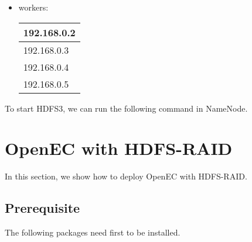 \documentclass[letterpaper,12pt]{article}
\newcommand{\openec}{{\sf\small OpenEC}\xspace}
\begin{document}
\begin{itemize}
\item workers:

\begin{center}
\footnotesize
\renewcommand{\arraystretch}{1.1}
\begin{tabular}{|l|}
\hline
192.168.0.2\\
\hline
192.168.0.3\\
\hline
192.168.0.4\\
\hline
192.168.0.5\\
\hline
\end{tabular}
\vspace{-3pt}
\end{center}

\end{itemize}

To start HDFS3, we can run the following command in NameNode.

\begin{center}
\noindent{}
\end{center}

\section{OpenEC with HDFS-RAID}
\label{sec:hdfsraid}

In this section, we show how to deploy \openec with HDFS-RAID.

\subsection{Prerequisite}

The following packages need first to be installed.
\end{document}
